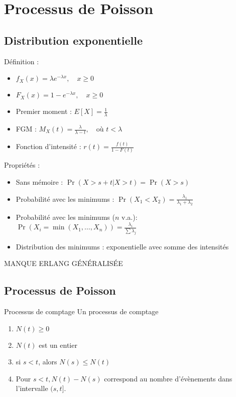 \chapter{Processus de Poisson}

\section{Distribution exponentielle}
Définition :

\begin{itemize}
	\item $\displaystyle f_X(x) = \lambda e^{-\lambda x}, \quad x \geq 0$
	\item $\displaystyle F_X(x) = 1 -  e^{-\lambda x}, \quad x \geq 0$
	\item Premier moment : $\displaystyle E[X] = \frac{1}{\lambda}$
	\item FGM : $\displaystyle M_X(t) = \frac{\lambda}{\lambda - t}, \quad \text{où } t < \lambda$
	\item Fonction d'intensité : $\displaystyle r(t) = \frac{f(t)}{1 - F(t)}$
\end{itemize}

Propriétés : 

\begin{itemize}
	\item Sans mémoire : $\displaystyle \Pr(X > s + t \vert X > t) = \Pr(X > s)$
	\item Probabilité avec les minimums : $\displaystyle \Pr(X_1 < X_2) = \frac{\lambda_1}{\lambda_1 + \lambda_2}$
	\item Probabilité avec les minimums ($n$ v.a.): $\displaystyle \Pr(X_i  = \min(X_1, \dots, X_n)) = \frac{\lambda_i}{\sum\lambda_j}$
	\item Distribution des minimums : exponentielle avec somme des intensités
\end{itemize}

MANQUE ERLANG GÉNÉRALISÉE

\section{Processus de Poisson}

\begin{definition}{Processus de comptage}{}
	Un processus de comptage 
	\begin{enumerate}
		\item $N(t) \geq 0$
		\item $N(t)$ est un entier
		\item si $s<t$, alors $N(s) \leq N(t)$
		\item Pour $s<t, N(t) - N(s)$ correspond au nombre d'évènements dans l'intervalle $(s, t]$.
	\end{enumerate}
\end{definition}

